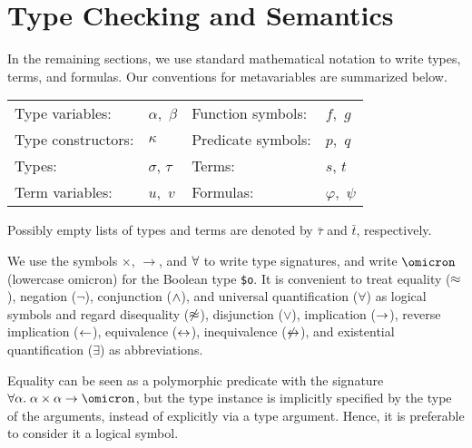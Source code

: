 \section{Type Checking and Semantics} \label{sec_semantics}

 In the remaining sections, we use standard
mathematical notation to write types, terms, and formulas. Our conventions
for metavariables are summarized below.
%
\begin{center}
\begin{tabular}{l@{\enskip}l@{\qquad}l@{\enskip}l}
Type variables: & $\alpha,$ $\beta$ &
  Function symbols: & $f,$ $g$ \\
Type constructors: & $\kappa$ &
  Predicate symbols: & $p,$ $q$ \\
Types: & $\sigma$, $\tau$ &
  Terms: & $s$, $t$ \\
Term variables: & $u,$ $v$ &
  Formulas: & $\varphi,$ $\psi$
\end{tabular}
\end{center}
%
Possibly empty lists of types and terms are denoted by $\bar{\tau}$ and
$\bar{t}$, respectively.

We use the symbols ${\times}$, ${\to}$, and ${\forall}$
to write type signatures, and write $\omicron$ (lowercase omicron) for the
Boolean type {\tt \$o}. It is convenient to treat
equality ($\approx$), negation ($\lnot$), conjunction ($\mathrel{\land}$), and universal
quantification ($\forall$) as logical symbols and regard disequality
($\not\approx$), disjunction ($\lor$), implication ($\rightarrow$), reverse implication
($\leftarrow$), equivalence ($\leftrightarrow$), inequivalence ($\not\leftrightarrow$), and existential
quantification ($\exists$) as abbreviations.

Equality can be seen as a polymorphic predicate with the signature
$\forall\alpha.\; \alpha\times\alpha\to\omicron$, but the type instance is
implicitly specified by the type of the arguments, instead of explicitly via a
type argument. Hence, it is preferable to consider it a logical
symbol.

